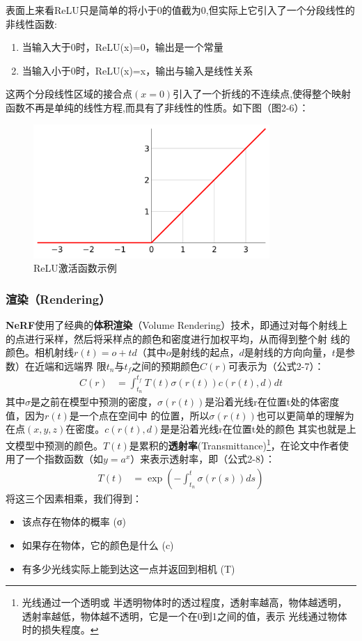 \documentclass{nwputhesis}
\begin{document}
表面上来看ReLU只是简单的将小于0的值截为0,但实际上它引入了一个分段线性的非线性函数:
\begin{enumerate}
    \item 当输入大于0时，ReLU(x)=0，输出是一个常量
    \item 当输入小于0时，ReLU(x)=x，输出与输入是线性关系
\end{enumerate}
这两个分段线性区域的接合点$(x=0)$引入了一个折线的不连续点,使得整个映射函数不再是单纯的线性方程,而具有了非线性的性质。如下图（图2-6）：
\begin{figure}[H]
    \centering
    \includegraphics[width=0.8\textwidth]{picture/8.png}
    \caption{ReLU激活函数示例}
\end{figure}
\subsubsection{渲染（Rendering）}
\textbf{NeRF}使用了经典的\textbf{体积渲染}（Volume Rendering）技术，即通过对每个射线上的点进行采样，然后将采样点的颜色和密度进行加权平均，从而得到整个射
线的颜色。相机射线$r(t) = o + td$（其中$o$是射线的起点，$d$是射线的方向向量，$t$是参数）在近端和远端界
限$t_n$与$t_f$之间的预期颜色$C(r)$可表示为（公式2-7）：
\begin{equation}
    \begin{aligned}
        C(r) &= \int_{t_n}^{t_f} T(t)\sigma(r(t))c(r(t),d)dt
    \end{aligned}
\end{equation}
\indent
其中$\sigma$是之前在模型中预测的密度，$\sigma(r(t))$是沿着光线r在位置t处的体密度值，因为$r(t)$是一个点在空间中
的位置，所以$\sigma(r(t))$也可以更简单的理解为在点$(x,y,z)$在密度。$c(r(t),d)$是是沿着光线r在位置t处的颜色
其实也就是上文模型中预测的颜色。$T(t)$是累积的\textbf{透射率}(Transmittance)\footnote{光线通过一个透明或
半透明物体时的透过程度，透射率越高，物体越透明，透射率越低，物体越不透明，它是一个在0到1之间的值，表示
光线通过物体时的损失程度。}，在论文中作者使用了一个指数函数（如$y=a^x$）来表示透射率，即（公式2-8）：
\begin{equation}
    \begin{aligned}
        T(t) &= \exp(-\int_{t_n}^{t} \sigma(r(s))ds)
    \end{aligned}
\end{equation}
\indent
将这三个因素相乘，我们得到：
\begin{itemize}
    \item 该点存在物体的概率 (σ)
    \item 如果存在物体，它的颜色是什么 (c)
    \item 有多少光线实际上能到达这一点并返回到相机 (T)
\end{itemize}
\end{document}
